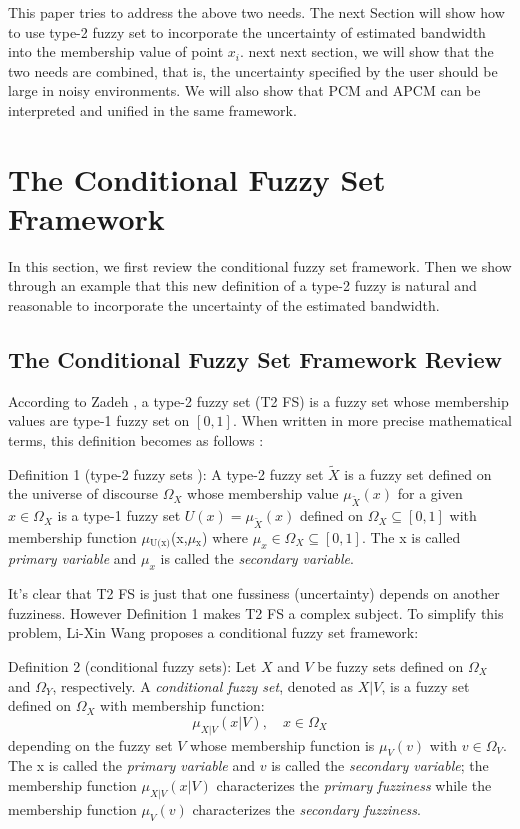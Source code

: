 \documentclass[journal]{IEEEtran}
\begin{document}
This paper tries to address the above two needs. The next Section will show how to use type-2 fuzzy set to incorporate the uncertainty of estimated bandwidth into the membership value of point $x_i$.
next next section, we will show that the two needs are combined, that is, the uncertainty specified by the user should be large in noisy environments. We will also show that PCM and APCM can be interpreted and  unified in the same framework.
\section{The Conditional Fuzzy Set Framework}
\label{sec-3}
In this section, we first review the conditional fuzzy set framework. Then we show through an example that this new definition of a type-2 fuzzy is natural and reasonable to incorporate the uncertainty of the estimated bandwidth.
\subsection{The Conditional Fuzzy Set Framework Review}
\label{sec-3-1}
According to Zadeh \cite{zadeh_concept_1975}, a type-2 fuzzy set (T2 FS) is a fuzzy set whose membership values are type-1 fuzzy set on $[0,1]$. When written in more precise mathematical terms,  this definition becomes as follows \cite{wang_new_2016}:

Definition 1 (type-2 fuzzy sets ): A type-2 fuzzy set $\tilde{X}$ is a fuzzy set defined on the universe of discourse $\Omega_X$ whose membership value $\mu_\tilde{X}(x)$ for a given $x\in\Omega_X$ is a type-1 fuzzy set  $U(x)=\mu_\tilde{X}(x)$ defined on $\Omega_X\subseteq[0,1]$ with membership function $\mu$$_{\text{U(x)}}$(x,$\mu$$_{\text{x}}$) where $\mu_x\in\Omega_X\subseteq[0,1]$. The x is called \emph{primary variable} and $\mu_x$ is called the \emph{secondary variable}. \qedsymbol

It's clear that T2 FS is just that one fussiness (uncertainty) depends on another fuzziness. However Definition 1 makes T2 FS a complex subject. To simplify this problem, Li-Xin Wang \cite{wang_new_2016} proposes a conditional fuzzy set framework:

Definition 2 (conditional fuzzy sets): Let $X$ and $V$ be fuzzy sets defined on $\Omega_X$ and $\Omega_Y$, respectively. A \emph{conditional fuzzy set}, denoted as $X|V$, is a fuzzy set defined on $\Omega_X$ with membership function:
\begin{equation}
\mu_{X|V}(x|V),\quad  x\in\Omega_X
\end{equation}
depending on the fuzzy set $V$ whose membership function is $\mu_V(v)$ with $v\in\Omega_V$. The x is called the \emph{primary variable} and $v$ is called the \emph{secondary variable}; the membership function $\mu_{X|V}(x|V)$ characterizes the \emph{primary fuzziness} while the membership function $\mu_V(v)$ characterizes the \emph{secondary fuzziness}.
\end{document}
